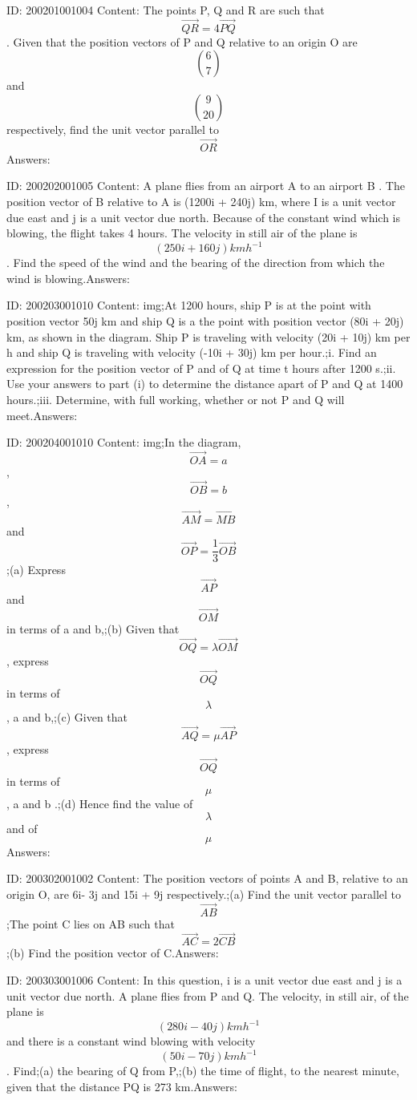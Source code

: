 \documentclass{article}
\begin{document}
ID: 200201001004
Content:
The points P, Q and R are such that $$\vec{QR}=4\vec{PQ}$$. Given that the position vectors of P and Q relative to an origin O are $$\binom{6}{7}$$ and $$\binom{9}{20}$$ respectively, find the unit vector parallel to $$\vec{OR}$$Answers:

ID: 200202001005
Content:
A plane flies from an airport A to an airport B . The position vector of B relative to A is (1200i + 240j) km, where I is a unit vector due east and j is a unit vector due north. Because of the constant wind which is blowing, the flight takes 4 hours. The velocity in still air of the plane is $$(250i + 160j) kmh^{-1}$$. Find the speed of the wind and the bearing of the direction from which the wind is blowing.Answers:

ID: 200203001010
Content:
img;At 1200 hours, ship P is at the point with position vector 50j km and ship Q is a the point with position vector (80i + 20j) km, as shown in the diagram. Ship P is traveling with velocity (20i + 10j) km per h and ship Q is traveling with velocity (-10i + 30j) km per hour.;i.	Find an expression for the position vector of P and of Q at time t hours after 1200 s.;ii.	Use your answers to part (i) to determine the distance apart of P and Q at 1400 hours.;iii.	Determine, with full working, whether or not P and Q will meet.Answers:

ID: 200204001010
Content:
img;In the diagram, $$\vec{OA}=a$$, $$\vec{OB}=b$$, $$\vec{AM}=\vec{MB}$$ and $$\vec{OP}={\frac{1 }{3}}\vec{OB}$$;(a)	Express $$\vec{AP}$$ and $$\vec{OM}$$ in terms of a and b,;(b)	Given that $$\vec{OQ}=\lambda \vec{OM}$$, express $$\vec{OQ}$$ in terms of $$\lambda$$, a and b,;(c)	Given that $$\vec{AQ}=\mu \vec{AP}$$, express $$\vec{OQ}$$ in terms of $$\mu$$, a and b .;(d) 	Hence find the value of $$\lambda$$ and of $$\mu$$Answers:

ID: 200302001002
Content:
The position vectors of points A and B, relative to an origin O, are 6i- 3j and 15i + 9j respectively.;(a)	Find the unit vector parallel to $$\vec{AB}$$;The point C lies on AB such that $$\vec{AC}=2\vec{CB}$$;(b)	Find the position vector of C.Answers:

ID: 200303001006
Content:
In this question, i is a unit vector due east and j is a unit vector due north. A plane flies from P and Q. The velocity, in still air, of the plane is $$(280i -40j) kmh^{-1}$$ and there is a constant wind blowing with velocity $$(50i - 70j) kmh^{-1}$$. Find;(a)	the bearing of Q from P,;(b) the time of flight, to the nearest minute, given that the distance PQ is 273 km.Answers:
\end{document}
